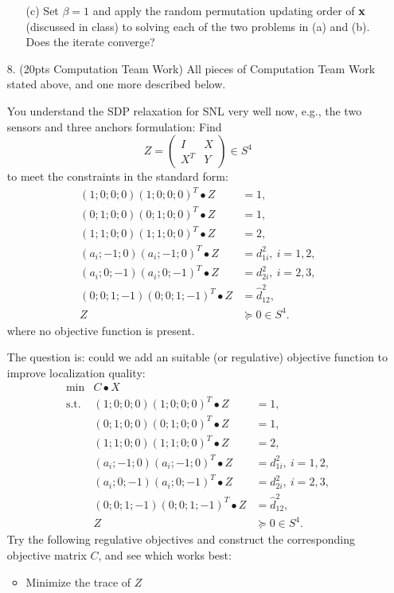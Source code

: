 \documentclass[12pt,letterpaper]{article}
\newcommand\x{{\bf x}}
\begin{document}
\begin{enumerate}
\begin{itemize}
\item[(c)] Set $\beta=1$ and apply the random permutation updating order of $\x$ (discussed in class) to solving each of the two problems in (a) and (b). Does the iterate converge?
\end{itemize}

\item[8.] (20pts Computation Team Work) 
All pieces of Computation Team Work stated above, and one more described below.

You understand the SDP relaxation for SNL very well now, e.g., the two sensors and three anchors formulation: Find
\[Z=\left(\begin{array}{cc}
              I & X\\
              X^T& Y\end{array}\right)\in S^4
\]
to meet the constraints in the standard form:
\[\begin{array}{cl}
(1;0;0;0)(1;0;0;0)^T\bullet Z &=1,\\
(0;1;0;0)(0;1;0;0)^T\bullet Z& =1,\\
(1;1;0;0)(1;1;0;0)^T\bullet Z& =2,\\
(a_i;-1;0)(a_i;-1;0)^T\bullet Z &= d^2_{1i},\ i=1,2,\\
(a_i;0;-1)(a_i;0;-1)^T\bullet Z &= d^2_{2i},\ i=2,3,\\
(0;0;1;-1)(0;0;1;-1)^T\bullet Z&=\hat{d}^2_{12},\\
Z &\succeq 0\in S^4.
\end{array}
\]
where no objective function is present. 

The question is: could we add an suitable (or regulative) objective function to improve localization quality:
\[\begin{array}{ccl}
\min          &  C\bullet X &\\
\mbox{s.t.}&(1;0;0;0)(1;0;0;0)^T\bullet Z &=1,\\
&(0;1;0;0)(0;1;0;0)^T\bullet Z& =1,\\
&(1;1;0;0)(1;1;0;0)^T\bullet Z& =2,\\
&(a_i;-1;0)(a_i;-1;0)^T\bullet Z &= d^2_{1i},\ i=1,2,\\
&(a_i;0;-1)(a_i;0;-1)^T\bullet Z &= d^2_{2i},\ i=2,3,\\
&(0;0;1;-1)(0;0;1;-1)^T\bullet Z&=\hat{d}^2_{12},\\
&Z &\succeq 0\in S^4.
\end{array}
\]
Try the following regulative objectives and construct the corresponding objective matrix $C$, and see which works best:
\begin{itemize}
\item Minimize the trace of $Z$


\end{itemize}
\end{enumerate}
\end{document}
